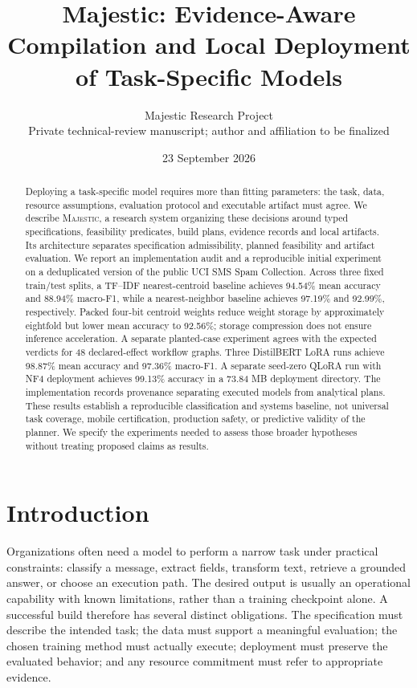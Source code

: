 \documentclass[11pt,a4paper]{article}
\title{Majestic: Evidence-Aware Compilation and Local Deployment of Task-Specific Models}
\author{Majestic Research Project\\
\small Private technical-review manuscript; author and affiliation to be finalized}
\date{23 September 2026}
\newcommand{\sys}{\textsc{Majestic}}
\begin{document}
\maketitle
\begin{abstract}
Deploying a task-specific model requires more than fitting parameters: the task,
data, resource assumptions, evaluation protocol and executable artifact must agree.
We describe \sys, a research system organizing these decisions around typed
specifications, feasibility predicates, build plans, evidence records and local
artifacts. Its architecture separates specification admissibility, planned
feasibility and artifact evaluation. We report an implementation audit and a
reproducible initial experiment on a deduplicated version of the public UCI SMS
Spam Collection. Across three fixed train/test splits, a TF--IDF nearest-centroid
baseline achieves 94.54\% mean accuracy and 88.94\% macro-F1, while a nearest-neighbor
baseline achieves 97.19\% and 92.99\%, respectively. Packed four-bit centroid
weights reduce weight storage by approximately eightfold but lower mean accuracy
to 92.56\%; storage compression does not ensure inference acceleration. A
separate planted-case experiment agrees with the expected verdicts for 48
declared-effect workflow graphs. Three DistilBERT LoRA runs achieve 98.87\%
mean accuracy and 97.36\% macro-F1. A separate seed-zero QLoRA run with NF4
deployment achieves 99.13\% accuracy in a 73.84 MB deployment directory.
The implementation records provenance separating executed models from
analytical plans. These results establish a reproducible classification and
systems baseline, not universal task coverage, mobile certification, production
safety, or predictive validity of the planner. We specify the experiments needed
to assess those broader hypotheses without treating proposed claims as results.
\end{abstract}

\section{Introduction}
Organizations often need a model to perform a narrow task under practical
constraints: classify a message, extract fields, transform text, retrieve a
grounded answer, or choose an execution path. The desired output is usually an
operational capability with known limitations, rather than a training checkpoint
alone. A successful build therefore has several distinct obligations. The
specification must describe the intended task; the data must support a meaningful
evaluation; the chosen training method must actually execute; deployment must
preserve the evaluated behavior; and any resource commitment must refer to
appropriate evidence.
\end{document}
